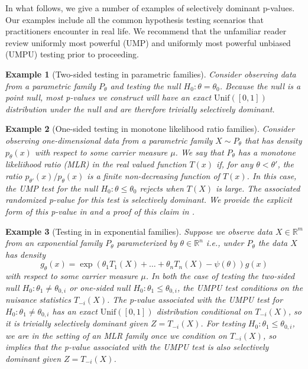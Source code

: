 \documentclass{article}
\newtheorem{example}{Example}
\newcommand{\R}{\mathbb{R}}
\begin{document}
In what follows, we give a number of examples of selectively dominant p-values. Our examples include all the common hypothesis testing scenarios that practitioners encounter in real life. We recommend that the unfamiliar reader review uniformly most powerful (UMP) and uniformly most powerful unbiased (UMPU) testing \cite[Chapter 3 and Chapter 4]{Lehmann} prior to proceeding.

\begin{example}[Two-sided testing in parametric families]
\label{exm:two-sided}
Consider observing data from a parametric family $P_{\theta}$ and testing the null $H_0 : \theta = \theta_0$. Because the null is a point null, most p-values we construct will have an exact $\text{Unif}([0, 1])$ distribution under the null and are therefore trivially selectively dominant. 
\end{example}

\begin{example}[One-sided testing in monotone likelihood ratio families]
\label{exm:mlr}
Consider observing one-dimensional data from a parametric family $X \sim P_{\theta}$ that has density $p_{\theta}(x)$ with respect to some carrier measure $\mu$. We say that $P_{\theta}$ has a monotone likeliihood ratio (MLR) in the real valued function $T(x)$ if, for any $\theta < \theta'$, the ratio $p_{\theta'}(x)/p_{\theta}(x)$ is a finite non-decreasing function of $T(x)$. In this case, the UMP test for the null $H_0: \theta \leq \theta_0$ rejects when $T(X)$ is large. The associated randomized p-value for this test is selectively dominant. We provide the explicit form of this p-value in  and a proof of this claim in .
\end{example}

\begin{example}[Testing in in exponential families]
\label{exm:exp_fam}
Suppose we observe data $X \in \R^m$ from an exponential family $P_{\theta}$ parameterized by $\theta \in \R^n$ i.e., under $P_{\theta}$ the data $X$ has density  
\begin{equation*}
    g_{\theta}(x) = \exp( \theta_1 T_1(X) + \dots + \theta_n T_n(X) - \psi(\theta) ) g(x) 
\end{equation*}
with respect to some carrier measure $\mu$. In both the case of testing the two-sided null $H_0: \theta_1 \neq \theta_{0, i}$ or one-sided null $H_0: \theta_1 \leq \theta_{0, i}$, the UMPU test conditions on the nuisance statistics $T_{-i}(X)$. The p-value associated with the UMPU test for $H_0: \theta_1 \neq \theta_{0, i}$ has an exact $\text{Unif}([0, 1])$ distribution conditional on $T_{-i}(X)$, so it is trivially selectively dominant given $Z = T_{-i}(X)$. For testing $H_0: \theta_1 \leq \theta_{0, i}$, we are in the setting of an MLR family once we condition on $T_{-i}(X)$, so  implies that the p-value associated with the UMPU test is also selectively dominant given $Z = T_{-i}(X)$.
\end{example}
\end{document}
